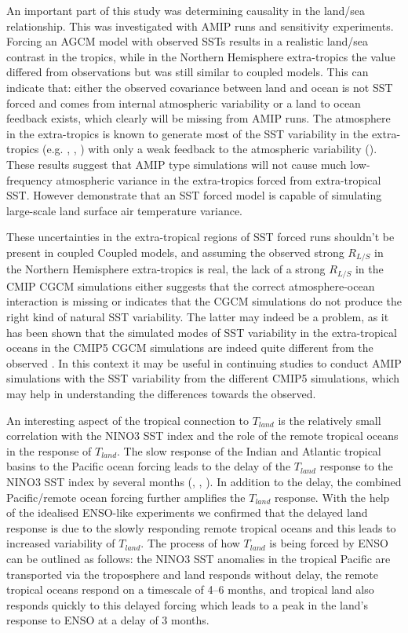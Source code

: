 An important part of this study was determining causality in the land/sea 
relationship. This was investigated with AMIP runs and sensitivity experiments.  
Forcing an AGCM model with observed SSTs results in a realistic land/sea 
contrast in the tropics, while in the Northern Hemisphere extra-tropics the 
value differed from observations but was still similar to coupled models. This 
can indicate that: either the observed covariance between land and ocean is not 
SST forced and comes from internal atmospheric variability or a land to ocean 
feedback exists, which clearly will be missing from AMIP runs. The atmosphere in 
the extra-tropics is known to generate most of the SST variability in the 
extra-tropics (e.g. \citealt{Hasselmann1976}, \citealt{Barsugli1998}, 
\citealt{D.2002}) with only a weak feedback to the atmospheric variability 
(\citealt{Barsugli1998}).  These results suggest that AMIP type simulations will 
not cause much low-frequency atmospheric variance in the extra-tropics forced 
from extra-tropical SST.  However \citet{Folland2005} demonstrate that an SST 
forced model is capable of simulating large-scale land surface air temperature 
variance.

These uncertainties in the extra-tropical regions of SST forced runs shouldn't 
be present in coupled Coupled models, and assuming the observed strong $R_{L/S}$ 
in the Northern Hemisphere extra-tropics is real, the lack of a strong $R_{L/S}$ 
in the CMIP CGCM simulations either suggests that the correct atmosphere-ocean 
interaction is missing or indicates that the CGCM simulations do not produce the 
right kind of natural SST variability.  The latter may indeed be a problem, as 
it has been shown that the simulated modes of SST variability in the 
extra-tropical oceans in the CMIP5 CGCM simulations are indeed quite different 
from the observed \citep{Wang2014}. In this context it may be useful in 
continuing studies to conduct AMIP simulations with the SST variability from the 
different CMIP5 simulations, which may help in understanding the differences 
towards the observed.

An interesting aspect of the tropical connection to $T_{land}$ is the relatively 
small correlation with the NINO3 SST index and the role of the remote tropical 
oceans in the response of $T_{land}$. The slow response of the Indian and 
Atlantic tropical basins to the Pacific ocean forcing leads to the delay of the
$T_{land}$ response to the NINO3 SST index by several months (\citealt{Lau1996}, 
\citealt{Chiang2005}, \citealt{Su2005}).  In addition to the delay, the combined 
Pacific/remote ocean forcing further amplifies the $T_{land}$ response.  With 
the help of the idealised ENSO-like experiments we confirmed that the delayed 
land response is due to the slowly responding remote tropical oceans and this 
leads to increased variability of $T_{land}$.  The process of how $T_{land}$ is 
being forced by ENSO can be outlined as follows: the NINO3 SST anomalies in the 
tropical Pacific are transported via the troposphere and land responds without 
delay, the remote tropical oceans respond on a timescale of 4--6 months, and 
tropical land also responds quickly to this delayed forcing which leads to a 
peak in the land's response to ENSO at a delay of 3 months.

